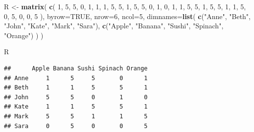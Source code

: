 \documentclass[10pt,b5paper,krantz1]{krantz}
\newenvironment{Shaded}{\begin{snugshade}}{\end{snugshade}}
\newcommand{\DataTypeTok}[1]{\textcolor[rgb]{0.27,0.27,0.27}{#1}}
\newcommand{\DecValTok}[1]{\textcolor[rgb]{0.06,0.06,0.06}{#1}}
\newcommand{\KeywordTok}[1]{\textcolor[rgb]{0.27,0.27,0.27}{\textbf{#1}}}
\newcommand{\NormalTok}[1]{#1}
\newcommand{\OtherTok}[1]{\textcolor[rgb]{0.37,0.37,0.37}{#1}}
\newcommand{\StringTok}[1]{\textcolor[rgb]{0.5,0.5,0.5}{#1}}
\begin{document}
\begin{Shaded}
\begin{Highlighting}[]
\NormalTok{R <-}\StringTok{ }\KeywordTok{matrix}\NormalTok{(}
    \KeywordTok{c}\NormalTok{(}
     \DecValTok{1}\NormalTok{, }\DecValTok{5}\NormalTok{, }\DecValTok{5}\NormalTok{, }\DecValTok{0}\NormalTok{, }\DecValTok{1}\NormalTok{,}
     \DecValTok{1}\NormalTok{, }\DecValTok{1}\NormalTok{, }\DecValTok{5}\NormalTok{, }\DecValTok{5}\NormalTok{, }\DecValTok{1}\NormalTok{,}
     \DecValTok{5}\NormalTok{, }\DecValTok{5}\NormalTok{, }\DecValTok{0}\NormalTok{, }\DecValTok{1}\NormalTok{, }\DecValTok{0}\NormalTok{,}
     \DecValTok{1}\NormalTok{, }\DecValTok{1}\NormalTok{, }\DecValTok{5}\NormalTok{, }\DecValTok{5}\NormalTok{, }\DecValTok{1}\NormalTok{,}
     \DecValTok{5}\NormalTok{, }\DecValTok{5}\NormalTok{, }\DecValTok{1}\NormalTok{, }\DecValTok{1}\NormalTok{, }\DecValTok{5}\NormalTok{,}
     \DecValTok{0}\NormalTok{, }\DecValTok{5}\NormalTok{, }\DecValTok{0}\NormalTok{, }\DecValTok{0}\NormalTok{, }\DecValTok{5}
\NormalTok{    ), }\DataTypeTok{byrow=}\OtherTok{TRUE}\NormalTok{, }\DataTypeTok{nrow=}\DecValTok{6}\NormalTok{, }\DataTypeTok{ncol=}\DecValTok{5}\NormalTok{,}
    \DataTypeTok{dimnames=}\KeywordTok{list}\NormalTok{(}
        \KeywordTok{c}\NormalTok{(}\StringTok{"Anne"}\NormalTok{, }\StringTok{"Beth"}\NormalTok{, }\StringTok{"John"}\NormalTok{, }\StringTok{"Kate"}\NormalTok{, }\StringTok{"Mark"}\NormalTok{, }\StringTok{"Sara"}\NormalTok{),}
        \KeywordTok{c}\NormalTok{(}\StringTok{"Apple"}\NormalTok{, }\StringTok{"Banana"}\NormalTok{, }\StringTok{"Sushi"}\NormalTok{, }\StringTok{"Spinach"}\NormalTok{, }\StringTok{"Orange"}\NormalTok{)}
\NormalTok{    )}
\NormalTok{)}
\end{Highlighting}
\end{Shaded}

\begin{Shaded}
\begin{Highlighting}[]
\NormalTok{R}
\end{Highlighting}
\end{Shaded}

\begin{verbatim}
##      Apple Banana Sushi Spinach Orange
## Anne     1      5     5       0      1
## Beth     1      1     5       5      1
## John     5      5     0       1      0
## Kate     1      1     5       5      1
## Mark     5      5     1       1      5
## Sara     0      5     0       0      5
\end{verbatim}
\end{document}
